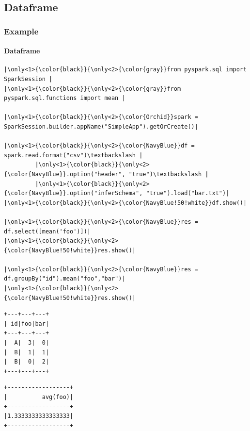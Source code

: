 \documentclass[aspectratio=169,usenames,dvipsnames]{beamer}
\begin{document}
\subsection{Dataframe}
\begin{frame}[fragile]
        \frametitle{Example}
        \framesubtitle{Dataframe}
        \vspace*{-1ex}
        \begin{center}
        \begin{minipage}{0.8\textwidth}
\begin{lstlisting}[escapechar={|}, title=dataframe.py]
|\only<1>{\color{black}}{\only<2>{\color{gray}}from pyspark.sql import SparkSession |
|\only<1>{\color{black}}{\only<2>{\color{gray}}from pyspark.sql.functions import mean |

|\only<1>{\color{black}}{\only<2>{\color{Orchid}}spark = SparkSession.builder.appName("SimpleApp").getOrCreate()|

|\only<1>{\color{black}}{\only<2>{\color{NavyBlue}}df = spark.read.format("csv")\textbackslash |
         |\only<1>{\color{black}}{\only<2>{\color{NavyBlue}}.option("header", "true")\textbackslash |
         |\only<1>{\color{black}}{\only<2>{\color{NavyBlue}}.option("inferSchema", "true").load("bar.txt")|
|\only<1>{\color{black}}{\only<2>{\color{NavyBlue!50!white}}df.show()|

|\only<1>{\color{black}}{\only<2>{\color{NavyBlue}}res = df.select([mean('foo')])|
|\only<1>{\color{black}}{\only<2>{\color{NavyBlue!50!white}}res.show()|

|\only<1>{\color{black}}{\only<2>{\color{NavyBlue}}res = df.groupBy("id").mean("foo","bar")|
|\only<1>{\color{black}}{\only<2>{\color{NavyBlue!50!white}}res.show()|

\end{lstlisting}
\end{minipage}
\end{center}
        
\end{frame}
\newsavebox{\mydfshowlisting}
\newsavebox{\myresoneshowlisting}
\newsavebox{\myrestwoshowlisting}
\begin{lrbox}{\mydfshowlisting}
\begin{lstlisting}[basicstyle=\ttfamily\tiny, frame=none]
+---+---+---+
| id|foo|bar|
+---+---+---+
|  A|  3|  0|
|  B|  1|  1|
|  B|  0|  2|
+---+---+---+
\end{lstlisting}
\end{lrbox}

\begin{lrbox}{\myresoneshowlisting}
\begin{lstlisting}[basicstyle=\ttfamily\tiny, frame=none]
+------------------+
|          avg(foo)|
+------------------+
|1.3333333333333333|
+------------------+
\end{lstlisting}
\end{lrbox}
\end{document}
